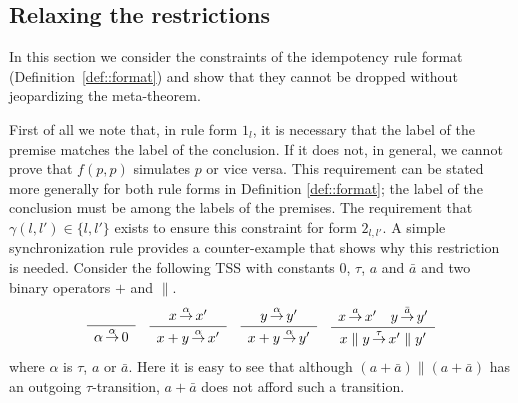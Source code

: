 \subsection{Relaxing the restrictions} %

In this section we consider the constraints of the idempotency rule format (Definition~\ref{def::format}) and 
show that they cannot be dropped without jeopardizing the meta-theorem.


First of all we note that, in rule form $1_l$, it is necessary that the label of the premise matches
the label of the conclusion.
If it does not, in general, we cannot prove that $f(p,p)$ simulates $p$ or vice versa.
This requirement can be stated more generally for both rule forms in Definition \ref{def::format};
the label of the conclusion must be among the labels of the premises.
The requirement that $\gamma(l,l') \in \{l,l'\}$ exists to ensure this constraint for form $2_{l,l'}$.
A simple synchronization rule provides a counter-example that shows why this restriction is needed.
Consider the following TSS with constants $0$, $\tau$, $a$ and $\bar{a}$ and two binary operators $+$ and $\parallel$.
\[
\begin{array}{c}
    \sosrule{}{\alpha \trans{\alpha} 0} \quad
    \sosrule{x \trans{\alpha} x'}{x + y \trans{\alpha} x' } \quad \sosrule{y \trans{\alpha} y'}{x + y \trans{\alpha} y' }
    \quad \sosrule{x \trans{a} x' \quad  y \trans{\bar{a}} y'}{x \parallel y \trans{\tau} x' \parallel y'}
\end{array}
\]
where $\alpha$ is $\tau$, $a$ or $\bar{a}$.
Here it is easy to see that although
$(a + \bar{a}) \parallel (a + \bar{a})$ has an outgoing \mbox{$\tau$-transition}, $a + \bar{a}$ does not afford such a transition.

